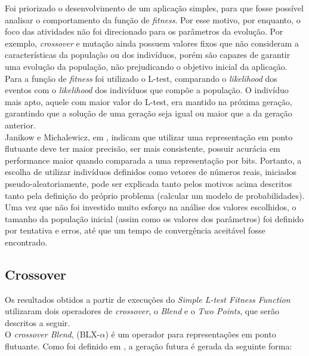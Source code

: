 Foi priorizado o desenvolvimento de um aplicação simples, para que fosse possível analisar o comportamento da função de {\it fitness}. Por esse motivo, por enquanto, o foco das atividades não foi direcionado para os parâmetros da evolução. Por exemplo, {\it crossover} e mutação ainda possuem valores fixos que não consideram a características da população ou dos indivíduos, porém são capazes de garantir uma evolução da população, não prejudicando o objetivo inicial da aplicação.\\

Para a função de {\it fitness} foi utilizado o L-test, comparando o {\it likelihood} dos eventos com o {\it likelihood} dos indivíduos que compõe a população. O indivíduo mais apto, aquele com maior valor do L-test, era mantido na próxima geração, garantindo que a solução de uma geração seja  igual ou maior que a da geração anterior.\\

Janikow e Michalewicz, em \cite{janikow1991experimental}, indicam que utilizar uma representação em ponto flutuante deve ter maior precisão, ser mais consistente, possuir acurácia em performance maior quando comparada a uma representação por bits. Portanto, a escolha de utilizar indivíduos definidos como vetores de números reais, iniciados pseudo-aleatoriamente, pode ser explicada tanto pelos motivos acima descritos tanto pela definição do próprio problema (calcular um modelo de probabilidades).\\

Uma vez que não foi investido muito esforço na análise dos valores escolhidos, o tamanho da população inicial (assim como os valores dos parâmetros) foi definido por tentativa e erros, até que um tempo de convergência aceitável fosse encontrado.\\


\subsection{Crossover}

Os resultados obtidos a partir de execuções do {\it Simple L-test Fitness Function} utilizaram dois operadores de {\it crossover}, o {\it Blend} e o {\it Two Points}, que serão descritos a seguir.\\



O {\it crossover Blend}, (BLX-$\alpha$) é um operador para representações em ponto flutuante. Como foi definido em \cite{takahashi2001crossover}, a geração futura é gerada da seguinte forma:

